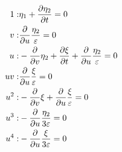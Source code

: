 \begin{align*}
1:&\eta_1 + \pdv{\eta_2}{t}=0\\
v:&\pdv{}{u} \frac{\eta_2}{\varepsilon}=0\\
u:&- \pdv{}{v} \eta_2 + \pdv{\xi}{t} + \pdv{}{u} \frac{\eta_2}{\varepsilon}=0\\
u v:&\pdv{}{u} \frac{\xi}{\varepsilon}=0\\
u^{2}:&- \pdv{}{v} \xi + \pdv{}{u} \frac{\xi}{\varepsilon}=0\\
u^{3}:&- \pdv{}{u} \frac{\eta_2}{3 \varepsilon}=0\\
u^{4}:&- \pdv{}{u} \frac{\xi}{3 \varepsilon}=0\\
\end{align*}